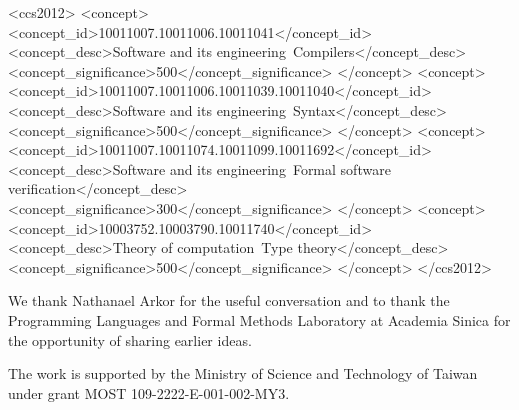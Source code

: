 \documentclass[acmsmall,screen]{acmart}
\theoremstyle{acmdefinition}
\begin{document}
\begin{CCSXML}
<ccs2012>
   <concept>
       <concept_id>10011007.10011006.10011041</concept_id>
       <concept_desc>Software and its engineering~Compilers</concept_desc>
       <concept_significance>500</concept_significance>
       </concept>
   <concept>
       <concept_id>10011007.10011006.10011039.10011040</concept_id>
       <concept_desc>Software and its engineering~Syntax</concept_desc>
       <concept_significance>500</concept_significance>
       </concept>
   <concept>
       <concept_id>10011007.10011074.10011099.10011692</concept_id>
       <concept_desc>Software and its engineering~Formal software verification</concept_desc>
       <concept_significance>300</concept_significance>
       </concept>
   <concept>
       <concept_id>10003752.10003790.10011740</concept_id>
       <concept_desc>Theory of computation~Type theory</concept_desc>
       <concept_significance>500</concept_significance>
       </concept>
 </ccs2012>
\end{CCSXML}



\maketitle










\begin{acks}
We thank Nathanael Arkor for the useful conversation and to thank the Programming Languages and Formal Methods Laboratory at Academia Sinica for the opportunity of sharing earlier ideas.

The work is supported by the Ministry of Science and Technology of Taiwan under grant MOST 109-2222-E-001-002-MY3.
\end{acks}



\end{document}
